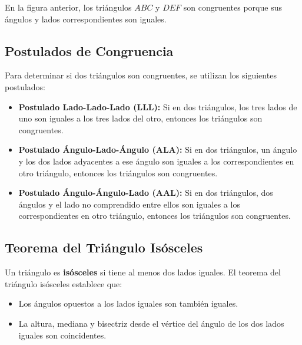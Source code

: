 En la figura anterior, los triángulos $ABC$ y $DEF$ son congruentes porque sus ángulos y lados correspondientes son iguales.

\subsection{Postulados de Congruencia}

Para determinar si dos triángulos son congruentes, se utilizan los siguientes postulados:

\begin{itemize}
    \item \textbf{Postulado Lado-Lado-Lado (LLL):} Si en dos triángulos, los tres lados de uno son iguales a los tres lados del otro, entonces los triángulos son congruentes.
    \item \textbf{Postulado Ángulo-Lado-Ángulo (ALA):} Si en dos triángulos, un ángulo y los dos lados adyacentes a ese ángulo son iguales a los correspondientes en otro triángulo, entonces los triángulos son congruentes.
    \item \textbf{Postulado Ángulo-Ángulo-Lado (AAL):} Si en dos triángulos, dos ángulos y el lado no comprendido entre ellos son iguales a los correspondientes en otro triángulo, entonces los triángulos son congruentes.
\end{itemize}

\subsection{Teorema del Triángulo Isósceles}

Un triángulo es \textbf{isósceles} si tiene al menos dos lados iguales. El teorema del triángulo isósceles establece que:

\begin{itemize}
    \item Los ángulos opuestos a los lados iguales son también iguales.
    \item La altura, mediana y bisectriz desde el vértice del ángulo de los dos lados iguales son coincidentes.
\end{itemize}

\begin{center}
\end{center}

